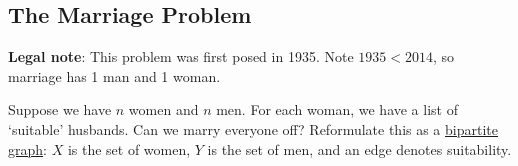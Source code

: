 \documentclass{article}
\begin{document}
\subsection{The Marriage Problem}
\textbf{Legal note}: This problem was first posed in 1935. Note $1935 < 2014$, so marriage has 1 man and 1 woman.

Suppose we have $n$ women and $n$ men. For each woman, we have a list of `suitable' husbands. Can we marry everyone off?
Reformulate this as a \hyperlink{def:bipartite}{bipartite graph}: $X$ is the set of women, $Y$ is the set of men, and an edge denotes suitability.
\end{document}
